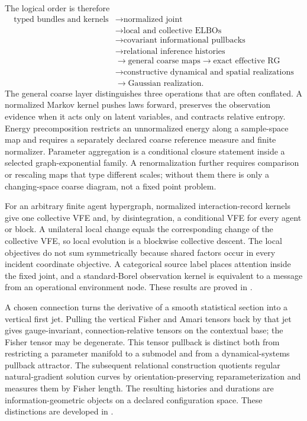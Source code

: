 The logical order is therefore
\[
\begin{aligned}
\text{typed bundles and kernels}
&\longrightarrow \text{normalized joint}\\
&\longrightarrow \text{local and collective ELBOs}\\
&\longrightarrow \text{covariant informational pullbacks}\\
&\longrightarrow \text{relational inference histories}\\
&\longrightarrow \text{general coarse maps}
\longrightarrow \text{exact effective RG}\\
&\longrightarrow \text{constructive dynamical and spatial realizations}\\
&\longrightarrow \text{Gaussian realization}.
\end{aligned}
\]
The general coarse layer distinguishes three operations that are often
conflated.  A normalized Markov kernel pushes laws forward, preserves the
observation evidence when it acts only on latent variables, and contracts
relative entropy.  Energy precomposition restricts an unnormalized energy
along a sample-space map and requires a separately declared coarse reference
measure and finite normalizer.  Parameter aggregation is a conditional
closure statement inside a selected graph-exponential family.  A
renormalization further requires comparison or rescaling maps that type
different scales; without them there is only a changing-space coarse diagram,
not a fixed point problem. 

For an arbitrary finite agent hypergraph, normalized interaction-record
kernels give one collective VFE and, by disintegration, a conditional VFE for
every agent or block.  A unilateral local change equals the corresponding
change of the collective VFE, so local evolution is a blockwise collective
descent.  The local objectives do not sum symmetrically because shared factors
occur in every incident coordinate objective.  A categorical source label
places attention inside the fixed joint, and a standard-Borel observation
kernel is equivalent to a message from an operational environment node.
These results are proved in .

A chosen connection turns the derivative of a smooth statistical section into
a vertical first jet.  Pulling the vertical Fisher and Amari tensors back by
that jet gives gauge-invariant, connection-relative tensors on the contextual
base; the Fisher tensor may be degenerate.  This tensor pullback is distinct
both from restricting a parameter manifold to a submodel and from a
dynamical-systems pullback attractor.  The subsequent relational construction
quotients regular natural-gradient solution curves by
orientation-preserving reparameterization and measures them by Fisher length.
The resulting histories and durations are information-geometric objects on a
declared configuration space. These distinctions are developed in
.

